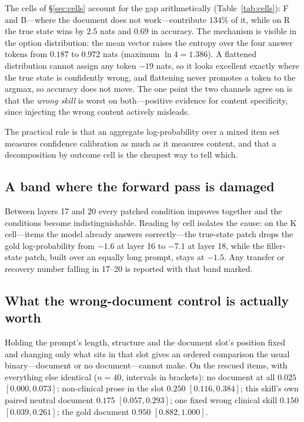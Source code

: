 \documentclass{article}
\begin{document}
The cells of \S\ref{sec:cells} account for the gap arithmetically
(Table~\ref{tab:cells}): F and B---where the document does not work---contribute
$134\%$ of it, while on R the true state wins by $2.5$ nats and $0.69$ in
accuracy. The mechanism is visible in the option distribution: the mean vector
raises the entropy over the four answer tokens from $0.187$ to $0.972$ nats
(maximum $\ln 4 = 1.386$). A flattened distribution cannot assign any token
$-19$ nats, so it looks excellent exactly where the true state is confidently
wrong, and flattening never promotes a token to the argmax, so accuracy does not
move. The one point the two channels agree on is that the \emph{wrong skill} is
worst on both---positive evidence for content specificity, since injecting the
wrong content actively misleads.

The practical rule is that an aggregate log-probability over a mixed item set
measures confidence calibration as much as it measures content, and that a
decomposition by outcome cell is the cheapest way to tell which.

\subsection{A band where the forward pass is damaged}

Between layers 17 and 20 every patched condition improves together and the
conditions become indistinguishable. Reading by cell isolates the cause: on the
K cell---items the model already answers correctly---the true-state patch drops
the gold log-probability from $-1.6$ at layer 16 to $-7.1$ at layer 18, while
the filler-state patch, built over an equally long prompt, stays at $-1.5$. Any
transfer or recovery number falling in 17--20 is reported with that band marked.

\subsection{What the wrong-document control is actually worth}
\label{sec:plausible}


Holding the prompt's length, structure and the document slot's position fixed and
changing only what sits in that slot gives an ordered comparison the usual
binary---document or no document---cannot make. On the rescued items, with
everything else identical ($n=40$, intervals in brackets): no document at all
$0.025$ $[0.000, 0.073]$; non-clinical prose in the slot $0.250$
$[0.116, 0.384]$; this skill's own paired neutral document $0.175$
$[0.057, 0.293]$; one fixed wrong clinical skill $0.150$ $[0.039, 0.261]$; the
gold document $0.950$ $[0.882, 1.000]$.
\end{document}
